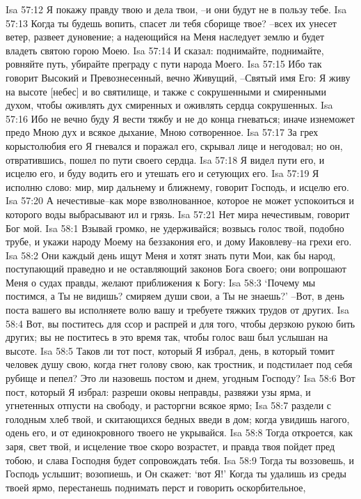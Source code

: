 Isa 57:12  Я покажу правду твою и дела твои, --и они будут не в пользу тебе.
Isa 57:13  Когда ты будешь вопить, спасет ли тебя сборище твое? --всех их унесет ветер, развеет дуновение; а надеющийся на Меня наследует землю и будет владеть святою горою Моею.
Isa 57:14  И сказал: поднимайте, поднимайте, ровняйте путь, убирайте преграду с пути народа Моего.
Isa 57:15  Ибо так говорит Высокий и Превознесенный, вечно Живущий, --Святый имя Его: Я живу на высоте [небес] и во святилище, и также с сокрушенными и смиренными духом, чтобы оживлять дух смиренных и оживлять сердца сокрушенных.
Isa 57:16  Ибо не вечно буду Я вести тяжбу и не до конца гневаться; иначе изнеможет предо Мною дух и всякое дыхание, Мною сотворенное.
Isa 57:17  За грех корыстолюбия его Я гневался и поражал его, скрывал лице и негодовал; но он, отвратившись, пошел по пути своего сердца.
Isa 57:18  Я видел пути его, и исцелю его, и буду водить его и утешать его и сетующих его.
Isa 57:19  Я исполню слово: мир, мир дальнему и ближнему, говорит Господь, и исцелю его.
Isa 57:20  А нечестивые--как море взволнованное, которое не может успокоиться и которого воды выбрасывают ил и грязь.
Isa 57:21  Нет мира нечестивым, говорит Бог мой.
Isa 58:1  Взывай громко, не удерживайся; возвысь голос твой, подобно трубе, и укажи народу Моему на беззакония его, и дому Иаковлеву--на грехи его.
Isa 58:2  Они каждый день ищут Меня и хотят знать пути Мои, как бы народ, поступающий праведно и не оставляющий законов Бога своего; они вопрошают Меня о судах правды, желают приближения к Богу:
Isa 58:3  `Почему мы постимся, а Ты не видишь? смиряем души свои, а Ты не знаешь?' --Вот, в день поста вашего вы исполняете волю вашу и требуете тяжких трудов от других.
Isa 58:4  Вот, вы поститесь для ссор и распрей и для того, чтобы дерзкою рукою бить других; вы не поститесь в это время так, чтобы голос ваш был услышан на высоте.
Isa 58:5  Таков ли тот пост, который Я избрал, день, в который томит человек душу свою, когда гнет голову свою, как тростник, и подстилает под себя рубище и пепел? Это ли назовешь постом и днем, угодным Господу?
Isa 58:6  Вот пост, который Я избрал: разреши оковы неправды, развяжи узы ярма, и угнетенных отпусти на свободу, и расторгни всякое ярмо;
Isa 58:7  раздели с голодным хлеб твой, и скитающихся бедных введи в дом; когда увидишь нагого, одень его, и от единокровного твоего не укрывайся.
Isa 58:8  Тогда откроется, как заря, свет твой, и исцеление твое скоро возрастет, и правда твоя пойдет пред тобою, и слава Господня будет сопровождать тебя.
Isa 58:9  Тогда ты воззовешь, и Господь услышит; возопиешь, и Он скажет: `вот Я!' Когда ты удалишь из среды твоей ярмо, перестанешь поднимать перст и говорить оскорбительное,
